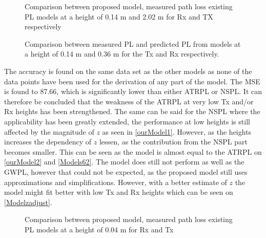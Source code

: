 \begin{figure}[H]
\centering

\caption{Comparison between proposed model, measured path loss existing PL models at a height of 0.14 m and 2.02 m for Rx and TX respectively}
\label{ourModel2}
\end{figure}

\begin{figure}[H]
\centering

\caption{Comparison between measured PL and predicted PL from models at a height of 0.14 m and 0.36 m for the Tx and Rx respectively.}
\label{Models62}
\end{figure}


The accuracy is found on the same data set as the other models as none of the data points have been used for the derivation of any part of the model. The MSE is found to 87.66, which is significantly lower than either ATRPL or NSPL. It can therefore be concluded that the weakness of the ATRPL at very low Tx and/or Rx heights has been strengthened. The same can be said for the NSPL where the applicability has been greatly extended, the performance at low heights is still affected by the magnitude of $z$ as seen in \autoref{ourModel1}. However, as the heights increases the dependency of $z$ lessen, as the contribution from the NSPL part becomes smaller. This can be seen as the model is almost equal to the ATRPL on \autoref{ourModel2} and \autoref{Models62}.  The model does still not perform as well as the GWPL, however that could not be expected, as the proposed model still uses approximations and simplifications. However, with a better estimate of $z$ the model might fit better with low Tx and Rx heights which can be seen on \autoref{Modelzadjust}. 


\begin{figure}[H]
\centering

\caption{Comparison between proposed model, measured path loss existing PL models at a height of 0.04 m for Rx and Tx}
\label{ourModel1}
\end{figure}




